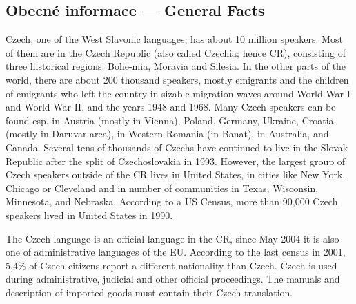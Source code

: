 \documentclass[]{../../metanetpaper}
\begin{document}
\begin{multicols}{2}

\subsection{Obecné informace --- General Facts}

Czech, one of the West Slavonic languages, has about 10 million speakers. Most of them are in the Czech Republic (also called Czechia; hence CR), consisting of three historical regions: Bohe-mia, Moravia and Silesia.\cite{Note1_en} In the other parts of the world, there are about 200 thousand speakers, mostly emigrants and the children of emigrants who left the country in sizable migration waves around World War I and World War II, and the years 1948 and 1968. Many Czech speakers can be found esp. in Austria (mostly in Vienna), Poland, Germany, Ukraine, Croatia (mostly in Daruvar area), in Western Romania (in Banat), in Australia, and Canada. Several tens of thousands of Czechs have continued to live in the Slovak Republic after the split of Czechoslovakia in 1993. However, the largest group of Czech speakers outside of the CR lives in United States, in cities like New York, Chicago or Cleveland and in number of communities in Texas, Wisconsin, Minnesota, and Nebraska. According to a US Census, more than 90,000 Czech speakers lived in United States in 1990.\cite{Note2}

The Czech language is an official language in the CR, since May 2004 it is also one of administrative languages of the EU. According to the last census in 2001, 5,4\% of Czech citizens report a different nationality than Czech. Czech is used during administrative, judicial and other official proceedings. The manuals and description of imported goods must contain their Czech translation.


\end{multicols}
\end{document}
